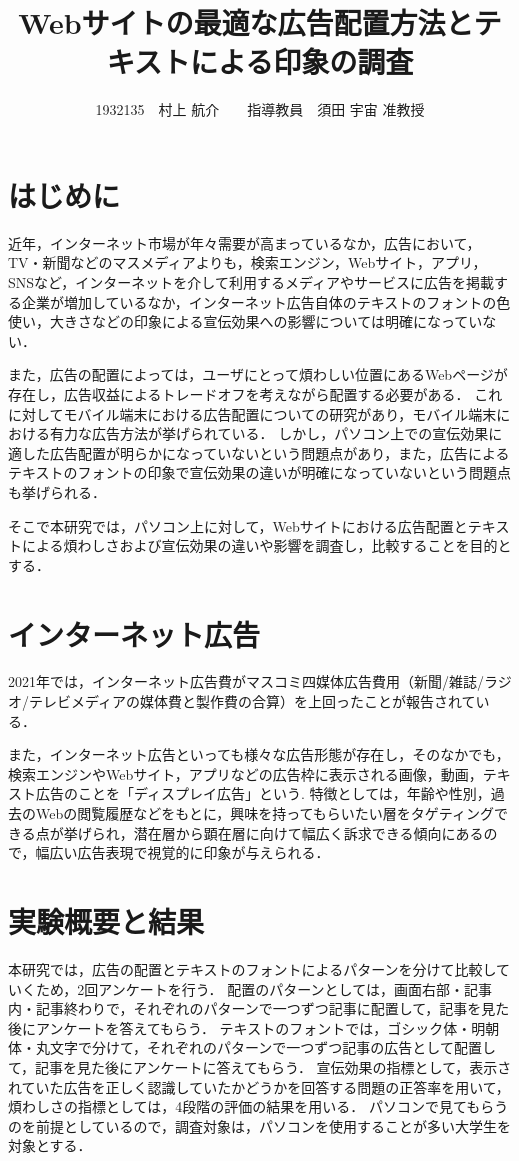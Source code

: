 \documentclass[twocolumn,10pt,a4j]{ltjsarticle}
\title{Webサイトの最適な広告配置方法とテキストによる印象の調査}
\author{1932135　村上 航介　　指導教員　須田 宇宙 准教授}
\date{}
\begin{document}
\maketitle

\section{はじめに}
近年，インターネット市場が年々需要が高まっているなか，広告において，TV・新聞などのマスメディアよりも，検索エンジン，Webサイト，アプリ，SNSなど，インターネットを介して利用するメディアやサービスに広告を掲載する企業が増加しているなか，インターネット広告自体のテキストのフォントの色使い，大きさなどの印象による宣伝効果への影響については明確になっていない．

また，広告の配置によっては，ユーザにとって煩わしい位置にあるWebページが存在し，広告収益によるトレードオフを考えながら配置する必要がある．
これに対してモバイル端末における広告配置についての研究があり，モバイル端末における有力な広告方法が挙げられている\cite{mobile}．
しかし，パソコン上での宣伝効果に適した広告配置が明らかになっていないという問題点があり，また，広告によるテキストのフォントの印象で宣伝効果の違いが明確になっていないという問題点も挙げられる．

そこで本研究では，パソコン上に対して，Webサイトにおける広告配置とテキストによる煩わしさおよび宣伝効果の違いや影響を調査し，比較することを目的とする．

\section{インターネット広告}
2021年では，インターネット広告費がマスコミ四媒体広告費用（新聞/雑誌/ラジオ/テレビメディアの媒体費と製作費の合算）を上回ったことが報告されている\cite{dentsu}．

また，インターネット広告といっても様々な広告形態が存在し，そのなかでも，検索エンジンやWebサイト，アプリなどの広告枠に表示される画像，動画，テキスト広告のことを「ディスプレイ広告」という.
特徴としては，年齢や性別，過去のWebの閲覧履歴などをもとに，興味を持ってもらいたい層をタゲティングできる点が挙げられ，潜在層から顕在層に向けて幅広く訴求できる傾向にあるので，幅広い広告表現で視覚的に印象が与えられる．

\section{実験概要と結果}
本研究では，広告の配置とテキストのフォントによるパターンを分けて比較していくため，2回アンケートを行う．
配置のパターンとしては，画面右部・記事内・記事終わりで，それぞれのパターンで一つずつ記事に配置して，記事を見た後にアンケートを答えてもらう．
テキストのフォントでは，ゴシック体・明朝体・丸文字で分けて，それぞれのパターンで一つずつ記事の広告として配置して，記事を見た後にアンケートに答えてもらう．
宣伝効果の指標として，表示されていた広告を正しく認識していたかどうかを回答する問題の正答率を用いて，煩わしさの指標としては，4段階の評価の結果を用いる．
パソコンで見てもらうのを前提としているので，調査対象は，パソコンを使用することが多い大学生を対象とする．
\end{document}
